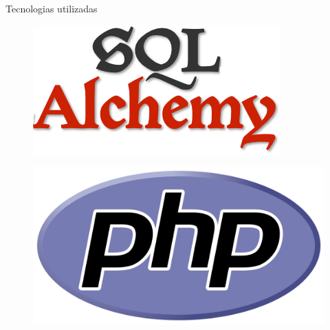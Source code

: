 \documentclass[10pt]{beamer}
\begin{document}
\begin{frame}{Tecnologias utilizadas}
\begin{multicols}{4}
\begin{figure}
            \label{fig:python}
        \end{figure}
        \begin{figure}
            \centering
            \vspace*{-.3cm}
            \includegraphics[width=\linewidth]{demo/images/sqlalchemy.png}
            \label{fig:python}
        \end{figure}
    \end{multicols}
    \begin{multicols}{3}
        \begin{figure}
            \centering
            
            \hfill
            
            \includegraphics[width=\linewidth]{demo/images/php.png}
            \label{fig:python}
        \end{figure}
        \begin{figure}
            \centering
            
            \hfill
            

\end{figure}
\end{multicols}
\end{frame}
\end{document}
